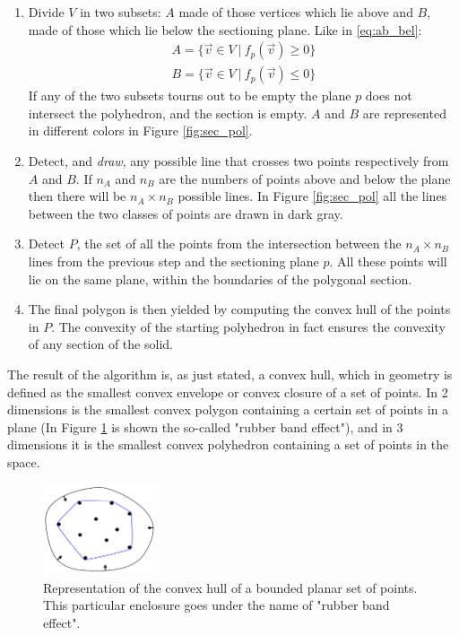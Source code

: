     \begin{enumerate}
        \item Divide $V$ in two subsets: $A$ made of those vertices which lie above and $B$, made of those which lie below the sectioning plane. Like in \ref{eq:ab_bel}:
        \begin{align}
            A = \{ \vec v \in V \ |\ f_p(\vec v)\geq 0\} \label{eq:ab_bel} \\
            B = \{ \vec v \in V \ |\ f_p(\vec v)\leq 0\} \nonumber
        \end{align}
        If any of the two subsets tourns out to be empty the plane $p$ does not intersect the polyhedron, and the section is empty. $A$ and $B$ are represented in different colors in Figure \ref{fig:sec_pol}.

        \item Detect, and \textit{draw}, any possible line that crosses two points respectively from $A$ and $B$. If $n_A$ and $n_B$ are the numbers of points above and below the plane then there will be $n_A \times n_B$ possible lines. In Figure \ref{fig:sec_pol} all the lines between the two classes of points are drawn in dark gray.

        \item Detect $P$, the set of all the points from the intersection between the $n_A \times n_B$ lines from the previous step and the sectioning plane $p$. All these points will lie on the same plane, within the boundaries of the polygonal section.

        \item The final polygon is then yielded by computing the convex hull of the points in $P$. The convexity of the starting polyhedron in fact ensures the convexity of any section of the solid.
    \end{enumerate}

    The result of the algorithm is, as just stated, a convex hull, which in geometry is defined as the smallest convex envelope or convex closure of a set of points. In 2 dimensions is the smallest convex polygon containing a certain set of points in a plane (In Figure \ref{fig:conv_hull} is shown the so-called "rubber band effect"), and in 3 dimensions it is the smallest convex polyhedron containing a set of points in the space.

    \begin{figure}
        \centering
        \includegraphics[width = 0.3\textwidth]{images/conv_hull}
        \caption{Representation of the convex hull of a bounded planar set of points. This particular enclosure goes under the name of "rubber band effect".}
        \label{fig:conv_hull}
    \end{figure}

